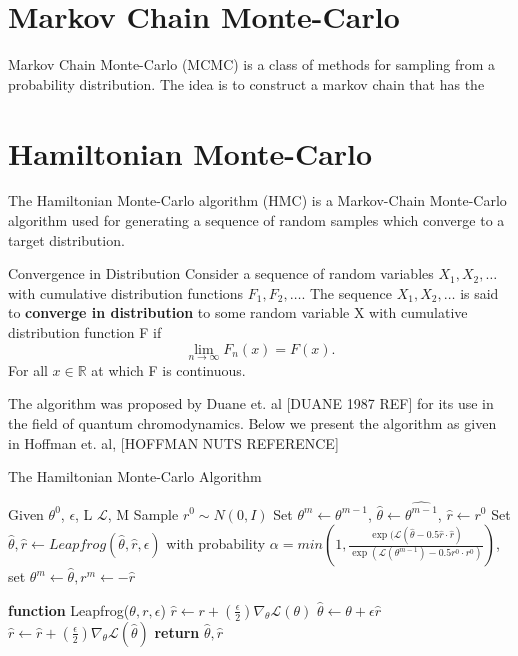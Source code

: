 \section{Markov Chain Monte-Carlo}
Markov Chain Monte-Carlo (MCMC) is a class of methods for sampling from a probability distribution. The idea is to construct a markov chain that has the 

\section{Hamiltonian Monte-Carlo}
The Hamiltonian Monte-Carlo algorithm (HMC) is a Markov-Chain Monte-Carlo algorithm used for generating a sequence of random samples which converge to a target distribution. 

\begin{definition}{Convergence in Distribution}
    Consider a sequence of random variables $X_1, X_2, \ldots$ with cumulative distribution functions $F_1, F_2, \ldots$. The sequence $X_1, X_2, \ldots$ is said to \textbf{converge in distribution} to some random variable X with cumulative distribution function F if 
    \[
        \lim_{n \to \infty}F_n(x) = F(x)
    .\] 
    For all $x \in \mathbb{R}$ at which F is continuous.
\end{definition}

The algorithm was proposed by Duane et. al [DUANE 1987 REF] for its use in the field of quantum chromodynamics. Below we present the algorithm as given in Hoffman et. al, [HOFFMAN NUTS REFERENCE] 

\begin{algorithm}
    \caption{The Hamiltonian Monte-Carlo Algorithm}\label{alg:hmc}
    \begin{algorithmic}
        \State Given $\theta^0$, $\epsilon$, L $\mathcal{L}$, M
            \State Sample $r^0 \sim N(0, I)$
            \State Set $\theta^m \leftarrow \theta^{m-1}$, $\hat{\theta} \leftarrow \hat{\theta^{m-1}}$, $\hat{r} \leftarrow r^0$
                \State Set $\hat{\theta}, \hat{r} \leftarrow Leapfrog(\hat{\theta},\hat{r},\epsilon)$
            \EndFor
            \State with probability $\alpha = min\left(1, \frac{\exp( \mathcal{L}(\hat{\theta}- 0.5 \hat{r}\cdot \hat{r})}{\exp( \mathcal{L}(\theta^{m-1}) -0.5r^0 \cdot r^0 )} \right)$, set $\theta^m \leftarrow \hat{\theta}, r^m \leftarrow -\hat{r}$ 
        \EndFor
    
    \State \textbf{function} Leapfrog($\theta, r, \epsilon$)
    \State $\hat{r} \leftarrow r + (\frac{\epsilon}{2})\nabla_{\theta}\mathcal{L}(\theta)$
    \State $\hat{\theta} \leftarrow \theta + \epsilon \hat{r}$
    \State $\hat{r} \leftarrow \hat{r} + (\frac{\epsilon}{2})\nabla_{\theta}\mathcal{L}(\hat{\theta})$
    \State \textbf{return} $\hat{\theta}, \hat{r}$
    \end{algorithmic}
\end{algorithm}

